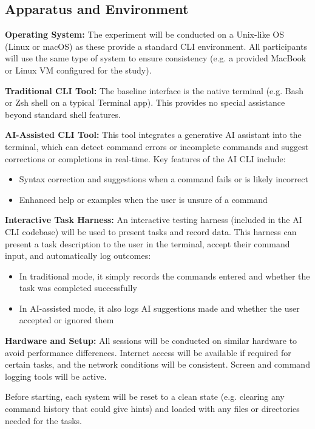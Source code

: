 \subsection{Apparatus and Environment}

\textbf{Operating System:} The experiment will be conducted on a Unix-like OS (Linux or macOS) as these provide a standard CLI environment. All participants will use the same type of system to ensure consistency (e.g. a provided MacBook or Linux VM configured for the study).

\textbf{Traditional CLI Tool:} The baseline interface is the native terminal (e.g. Bash or Zsh shell on a typical Terminal app). This provides no special assistance beyond standard shell features.

\textbf{AI-Assisted CLI Tool:} This tool integrates a generative AI assistant into the terminal, which can detect command errors or incomplete commands and suggest corrections or completions in real-time. Key features of the AI CLI include:
\begin{itemize}
	\item Syntax correction and suggestions when a command fails or is likely incorrect
	\item Enhanced help or examples when the user is unsure of a command
\end{itemize}

\textbf{Interactive Task Harness:} An interactive testing harness (included in the AI CLI codebase) will be used to present tasks and record data. This harness can present a task description to the user in the terminal, accept their command input, and automatically log outcomes:
\begin{itemize}
	\item In traditional mode, it simply records the commands entered and whether the task was completed successfully
	\item In AI-assisted mode, it also logs AI suggestions made and whether the user accepted or ignored them
\end{itemize}

\textbf{Hardware and Setup:} All sessions will be conducted on similar hardware to avoid performance differences. Internet access will be available if required for certain tasks, and the network conditions will be consistent. Screen and command logging tools will be active.

Before starting, each system will be reset to a clean state (e.g. clearing any command history that could give hints) and loaded with any files or directories needed for the tasks.

